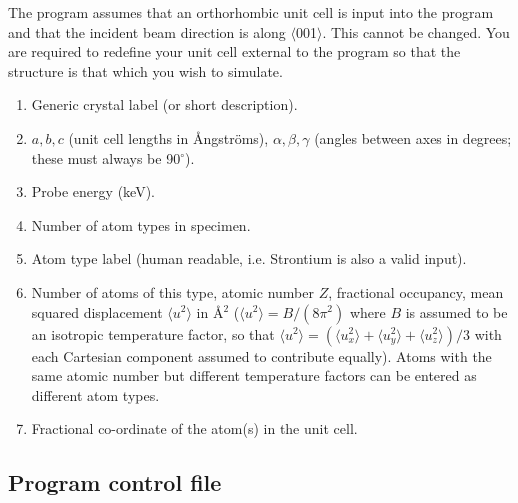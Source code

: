 \documentclass[12pt,a4paper]{article}
\begin{document}
The program assumes that an orthorhombic unit cell is input into the program and that the incident beam direction is along $\langle$001$\rangle$.
This cannot be changed.
You are required to redefine your unit cell external to the program so that the structure is that which you wish to simulate.

\begin{enumerate}
\item{Generic crystal label (or short description).}
\item{$a,b,c$ (unit cell lengths in {\AA}ngstr\"oms), $\alpha, \beta, \gamma$ (angles between axes in degrees; these must always be 90$^\circ$).}
\item{ Probe energy (keV).}
\item{ Number of atom types in specimen.}
\item{ Atom type label (human readable,  i.e. Strontium is also a valid input).}
\item{ Number of atoms of this type, atomic number $Z$, fractional occupancy, mean squared displacement $\langle u^2 \rangle$ in {\AA}$^2$ ($\langle u^2\rangle  = B / (8 \pi^2)$ where $B$ is assumed to be an isotropic temperature factor, so that $\langle u^2 \rangle  = (\langle u_x^2\rangle+\langle u_y^2\rangle+\langle u_z^2\rangle)/3$ with each Cartesian component assumed to contribute equally). Atoms with the same atomic number but different temperature factors can be entered as different atom types.}
\item{ Fractional co-ordinate of the atom(s) in the unit cell.}

\end{enumerate}
%






\subsection{Program control file}\label{userinput}
\end{document}

